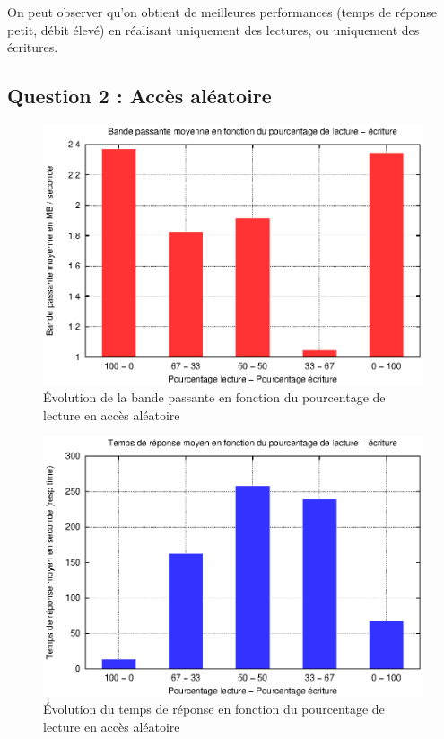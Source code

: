 \documentclass[a4paper]{article}
\begin{document}
On peut observer qu'on obtient de meilleures performances (temps de réponse petit, débit élevé) en réalisant uniquement des lectures, ou uniquement des écritures.\\


\newpage
\subsection{Question 2 : Accès aléatoire}

\begin{figure}[h]
	\begin{center}
		\includegraphics[scale=0.70]{Question2/bande_passante_moyenne.eps}
	\end{center}
   	\caption{Évolution de la bande passante en fonction du pourcentage de lecture en accès aléatoire}
	\label{fig:courbe_bande_passante_lect_alea}
\end{figure}

\FloatBarrier

\begin{figure}[h]
	\begin{center}
		\includegraphics[scale=0.70]{Question2/tps_resp_moyen.eps}
	\end{center}
   	\caption{Évolution du temps de réponse en fonction du pourcentage de lecture en accès aléatoire}
	\label{fig:courbe_tps_rep_lect_alea}
\end{figure}
\end{document}
